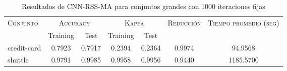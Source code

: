 \begin{table}[]
\centering
\begin{tabular}{l c c c c c c}
\hline
\multirow{2}{*}{\textsc{Conjunto}}
	& \multicolumn{2}{c}{\textsc{Accuracy}}
	& \multicolumn{2}{c}{\textsc{Kappa}}
	& \textsc{Reducción}
	& \textsc{Tiempo promedio (seg)} \\
	& Training & Test
	& Training & Test \\ 
\hline
\hline

credit-card & 0.7923 & 0.7917 & 0.2394 & 0.2364 & 0.9974 & 94.9568 \\
shuttle & 0.9791 & 0.9985 & 0.9958 & 0.9956 & 0.9440 & 1185.5700 \\

\hline
\end{tabular}
\caption{Resultados de CNN-RSS-MA para conjuntos grandes con 1000 iteraciones fijas}
\label{res-grande-CNN-RSS-MA}
\end{table}

